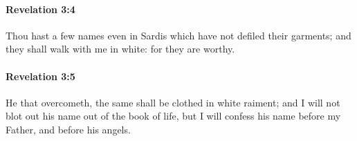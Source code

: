 		\paragraph{Revelation 3:4} %
			\label{REVELATIONNT-3-4}

			Thou hast a few names even in Sardis which have not defiled their garments; and they shall walk with me in white: for they are worthy.

			\begin{framed}
			\scriptsize
				\begin{compactdesc}
					\item[SBLG] 
				\end{compactdesc}
			\end{framed}

		\paragraph{Revelation 3:5} %
			\label{REVELATIONNT-3-5}

			He that overcometh, the same shall be clothed in white raiment; and I will not blot out his name out of the book of life, but I will confess his name before my Father, and before his angels.

